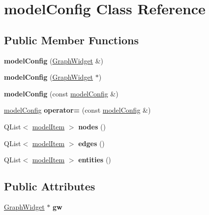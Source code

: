 \hypertarget{classmodel_config}{}\section{model\+Config Class Reference}
\label{classmodel_config}
\subsection*{Public Member Functions}
\begin{DoxyCompactItemize}
\item 
\mbox{\label{classmodel_config_a838a10ed3b59320ab9220e0fc185da48}} 
{\bfseries model\+Config} (\hyperlink{class_graph_widget}{Graph\+Widget} \&)
\item 
\mbox{\label{classmodel_config_a6cde5064826be3d9906f20e3bfd5de82}} 
{\bfseries model\+Config} (\hyperlink{class_graph_widget}{Graph\+Widget} $\ast$)
\item 
\mbox{\label{classmodel_config_afa3012013f99920879a820e42f93481e}} 
{\bfseries model\+Config} (const \hyperlink{classmodel_config}{model\+Config} \&)
\item 
\mbox{\label{classmodel_config_a1d5c12c80728ad7f8c0774eedc5e7a39}} 
\hyperlink{classmodel_config}{model\+Config} {\bfseries operator=} (const \hyperlink{classmodel_config}{model\+Config} \&)
\item 
\mbox{\label{classmodel_config_aa0ecbf9d05dcd86d854efd466e3b16b5}} 
Q\+List$<$ \hyperlink{classmodel_item}{model\+Item} $>$ {\bfseries nodes} ()
\item 
\mbox{\label{classmodel_config_aca2fa5488e25e3e84cca286107ddaf3a}} 
Q\+List$<$ \hyperlink{classmodel_item}{model\+Item} $>$ {\bfseries edges} ()
\item 
\mbox{\label{classmodel_config_a4930dcfb12de4bed537c9ca74030724f}} 
Q\+List$<$ \hyperlink{classmodel_item}{model\+Item} $>$ {\bfseries entities} ()
\end{DoxyCompactItemize}
\subsection*{Public Attributes}
\begin{DoxyCompactItemize}
\item 
\mbox{\label{classmodel_config_a3fc7fcf74f9e6a400831e920b87c5ebe}} 
\hyperlink{class_graph_widget}{Graph\+Widget} $\ast$ {\bfseries gw}
\end{DoxyCompactItemize}


